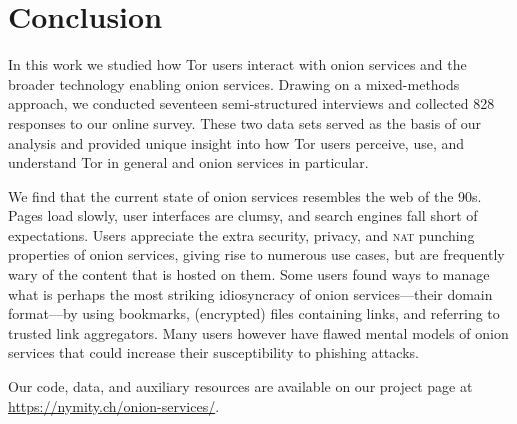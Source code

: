 \section{Conclusion}
\label{sec:conclusion}

In this work we studied how Tor users interact with onion services and the
broader technology enabling onion services.  Drawing on a mixed-methods
approach, we conducted seventeen semi-structured interviews and collected 828
responses to our online survey.  These two data sets served as the basis of our
analysis and provided unique insight into how Tor users perceive, use, and
understand Tor in general and onion services in particular.

We find that the current state of onion services resembles the web of the 90s.
Pages load slowly, user interfaces are clumsy, and search engines fall short of
expectations.  Users appreciate the extra security, privacy, and \textsc{nat}
punching properties of onion services, giving rise to numerous use cases, but
are frequently wary of the content that is hosted on them.  Some users found
ways to manage what is perhaps the most striking idiosyncracy of onion
services---their domain format---by using bookmarks, (encrypted) files
containing links, and referring to trusted link aggregators.  Many users however
have flawed mental models of onion services that could increase their
susceptibility to phishing attacks.

Our code, data, and auxiliary resources are available on our project page at
\url{https://nymity.ch/onion-services/}.
